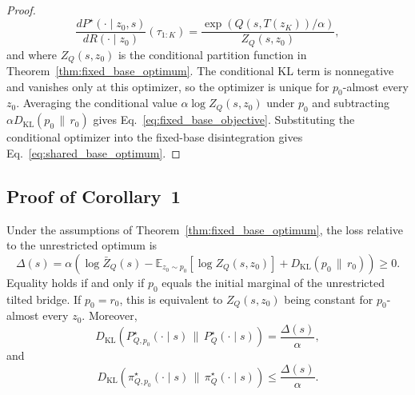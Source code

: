 \documentclass[11pt]{article}
\begin{document}
\begin{proof}
\begin{equation}
  \frac{
    dP^\star(\cdot\mid z_0,s)
  }{
    dR(\cdot\mid z_0)
  }(\tau_{1:K})
  =
  \frac{
    \exp(Q(s,T(z_K))/\alpha)
  }{
    Z_Q(s,z_0)
  },
\end{equation}
and where $Z_Q(s,z_0)$ is the conditional partition function in Theorem~\ref{thm:fixed_base_optimum}. The conditional KL term is nonnegative and vanishes only at this optimizer, so the optimizer is unique for $p_0$-almost every $z_0$. Averaging the conditional value $\alpha\log Z_Q(s,z_0)$ under $p_0$ and subtracting $\alpha D_{\mathrm{KL}}(p_0\,\|\,r_0)$ gives Eq.~\eqref{eq:fixed_base_objective}. Substituting the conditional optimizer into the fixed-base disintegration gives Eq.~\eqref{eq:shared_base_optimum}.
\end{proof}

\subsection{Proof of Corollary~1}
\label{app:proof_base_gap}

\begin{restatement}
Under the assumptions of Theorem~\ref{thm:fixed_base_optimum}, the loss relative to the unrestricted optimum is
\[
  \Delta(s)
  =
  \alpha
  \left(
    \log \bar Z_Q(s)
    -
    \mathbb E_{z_0\sim p_0}
    \left[
      \log Z_Q(s,z_0)
    \right]
    +
    D_{\mathrm{KL}}
    \left(
      p_0
      \,\|\,
      r_0
    \right)
  \right)
  \ge 0.
\]
Equality holds if and only if $p_0$ equals the initial marginal of the unrestricted tilted bridge. If $p_0=r_0$, this is equivalent to $Z_Q(s,z_0)$ being constant for $p_0$-almost every $z_0$. Moreover,
\[
  D_{\mathrm{KL}}
  \left(
    P_{Q,p_0}^\star(\cdot\mid s)
    \,\|\,P_Q^\star(\cdot\mid s)
  \right)
  =
  \frac{
    \Delta(s)
  }{
    \alpha
  },
\]
and
\[
  D_{\mathrm{KL}}
  \left(
    \pi_{Q,p_0}^\star(\cdot\mid s)
    \,\|\,\pi_Q^\star(\cdot\mid s)
  \right)
  \le
  \frac{
    \Delta(s)
  }{
    \alpha
  }.
\]

\end{restatement}
\end{document}
